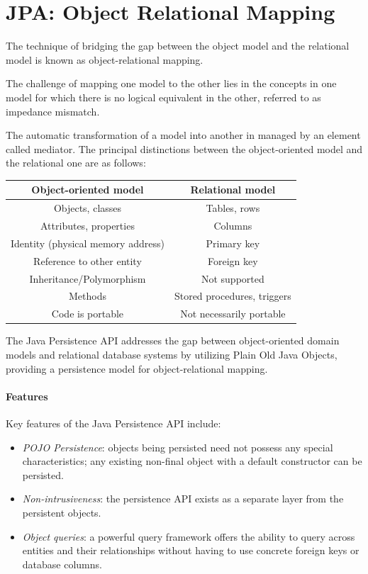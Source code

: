 \section{JPA: Object Relational Mapping}

The technique of bridging the gap between the object model and the relational model is known as object-relational mapping. 
\begin{definition}
    The challenge of mapping one model to the other lies in the concepts in one model for which there is no logical equivalent in the other, referred to as impedance mismatch.
\end{definition}
The automatic transformation of a model into another in managed by an element called mediator. 
The principal distinctions between the object-oriented model and the relational one are as follows:
\begin{table}[H]
    \centering
    \begin{tabular}{cc}
    \hline
    \textbf{Object-oriented model}     & \textbf{Relational model}   \\ \hline
    Objects, classes                   & Tables, rows                \\
    Attributes, properties             & Columns                     \\
    Identity (physical memory address) & Primary key                 \\
    Reference to other entity          & Foreign key                 \\
    Inheritance/Polymorphism           & Not supported               \\
    Methods                            & Stored procedures, triggers \\
    Code is portable                   & Not necessarily portable    \\ \hline
    \end{tabular}
\end{table}
The Java Persistence API addresses the gap between object-oriented domain models and relational database systems by utilizing Plain Old Java Objects, providing a persistence model for object-relational mapping.

\paragraph*{Features}
Key features of the Java Persistence API include:
\begin{itemize}
    \item \textit{POJO Persistence}: objects being persisted need not possess any special characteristics; any existing non-final object with a default constructor can be persisted.
    \item \textit{Non-intrusiveness}: the persistence API exists as a separate layer from the persistent objects.
    \item \textit{Object queries}: a powerful query framework offers the ability to query across entities and their relationships without having to use concrete foreign keys or database columns.
\end{itemize}

